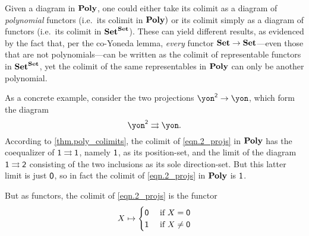 \documentclass[Book-Poly]{subfiles}
\begin{document}
\begin{example}
Given a diagram in $\mathbf{Poly}$, one could either take its colimit as a diagram of \emph{polynomial} functors (i.e.\ its colimit in $\mathbf{Poly})$ or its colimit simply as a diagram of functors (i.e.\ its colimit in $\mathbf{Set}^{\mathbf{Set}}$).
These can yield different results, as evidenced by the fact that, per the co-Yoneda lemma, \emph{every} functor $\mathbf{Set} \to \mathbf{Set}$---even those that are not polynomials---can be written as the colimit of representable functors in $\mathbf{Set}^{\mathbf{Set}}$, yet the colimit of the same representables in $\mathbf{Poly}$ can only be another polynomial.

As a concrete example, consider the two projections $\yon^\2\to\yon$, which form the diagram
\begin{equation} \label{eqn.2_projs}
    \yon^\2\tto\yon.
\end{equation}
According to \cref{thm.poly_colimits}, the colimit of \eqref{eqn.2_projs} in $\mathbf{Poly}$ has the coequalizer of $\textsf{1} \rightrightarrows \textsf{1}$, namely $\textsf{1}$, as its position-set, and the limit of the diagram $\textsf{1} \rightrightarrows \textsf{2}$ consisting of the two inclusions as its sole direction-set.
But this latter limit is just $\textsf{0}$, so in fact the colimit of \eqref{eqn.2_projs} in $\mathbf{Poly}$ is $\textsf{1}$.

But as functors, the colimit of \eqref{eqn.2_projs} is the functor
\[
  X\mapsto
  \begin{cases}
  	\textsf{0}&\textnormal{ if }X=\textsf{0}\\
  	\textsf{1}&\textnormal{ if }X\neq\textsf{0}
  \end{cases}
\]
\end{example}
\end{document}

